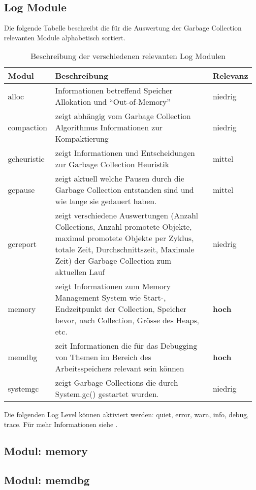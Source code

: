 \subsection{Log Module}\label{logmodule}

Die folgende Tabelle beschreibt die für die Auswertung der Garbage Collection relevanten Module alphabetisch sortiert. 

\begin{longtable}{|p{4cm}|p{9cm}|p{2cm}|}
    \caption{Beschreibung der verschiedenen relevanten Log Modulen}\\\hline
  \textbf{Modul} & \textbf{Beschreibung} & \textbf{Relevanz}\\\hline
  alloc & Informationen betreffend Speicher Allokation und ``Out-of-Memory'' & niedrig \\\hline
  compaction & zeigt abhängig vom Garbage Collection Algorithmus Informationen zur Kompaktierung& niedrig \\\hline
  gcheuristic & zeigt Informationen und Entscheidungen zur Garbage Collection Heuristik & mittel \\\hline
  gcpause & zeigt aktuell welche Pausen durch die Garbage Collection entstanden sind und wie lange sie gedauert haben. & mittel \\\hline
  gcreport & zeigt verschiedene Auswertungen (Anzahl Collections, Anzahl promotete Objekte, maximal promotete Objekte per Zyklus, totale Zeit, Durchschnittszeit, Maximale Zeit) der Garbage Collection zum aktuellen Lauf& niedrig \\\hline
  memory & zeigt Informationen zum Memory Management System wie Start-, Endzeitpunkt der Collection, Speicher bevor, nach Collection, Grösse des Heaps, etc.& \textbf{hoch} \\\hline
  memdbg & zeit Informationen die für das Debugging von Themen im Bereich des Arbeitsspeichers relevant sein können& \textbf{hoch} \\\hline
  systemgc & zeigt Garbage Collections die durch System.gc() gestartet wurden. & niedrig \\\hline
\end{longtable}

Die folgenden Log Level können aktiviert werden: quiet, error, warn, info, debug, trace. Für mehr Informationen siehe \cite{oracleJRockitR28CLR}.


\subsection{Modul: memory}


\subsection{Modul: memdbg}


